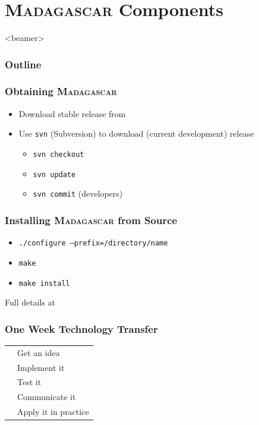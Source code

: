 \section{\textsc{Madagascar} Components}

\begin{frame}<beamer>
  \MadLogo
  \frametitle{Outline}
  \tableofcontents[currentsection]
\end{frame}

\begin{frame}
  \MadLogo
  \frametitle{Obtaining \textsc{Madagascar}}
  \begin{itemize}
    \item Download stable release from
      {}
    \item Use \texttt{svn} (Subversion) to download {} (current
      development) release
      \begin{itemize}
        \item \texttt{svn checkout}
        \item \texttt{svn update}
        \item \texttt{svn commit} (developers)
      \end{itemize}
  \end{itemize}
\end{frame}

\begin{frame}
  \frametitle{Installing \textsc{Madagascar} from Source}
  \begin{itemize}
  \item \texttt{./configure --prefix=/directory/name}
  \item \texttt{make}
  \item \texttt{make install}
  \end{itemize}
  \begin{center}
  Full details at
  {} \\
  {}
\end{center}
\end{frame}

\begin{frame}
  \MadLogo

  \frametitle{One Week Technology Transfer}
  \begin{tabular}{rl}
  \textbf{\color{blue}{Monday:}} & Get an idea \\
  \textbf{\color{blue}{Tuesday:}} & Implement it \\
  \textbf{\color{blue}{Wednesday:}} & Test it \\
  \textbf{\color{blue}{Thursday:}} & Communicate it \\
  \textbf{\color{blue}{Friday:}} & Apply it in practice
  \end{tabular}
\end{frame}

